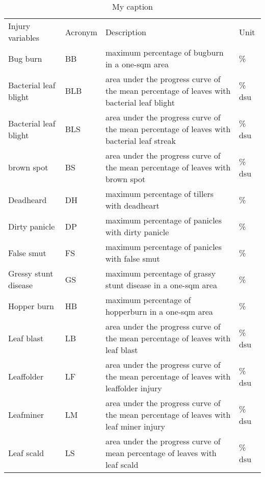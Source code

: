 \begin{table}[]
\centering
\caption{My caption}
\label{my-label}
\begin{tabular}{llll}
Injury variables              & Acronym & Description                                                                              & Unit  \\
Bug burn              & BB      & maximum percentage of bugburn in a one-sqm area                                           & \%     \\
Bacterial leaf blight & BLB     & area under the progress curve of the mean percentage of leaves with bacterial leaf blight & \% dsu \\
Bacterial leaf blight & BLS     & area under the progress curve of the mean percentage of leaves with bacterial leaf streak & \% dsu \\
brown spot            & BS      & area under the progress curve of the mean percentage of leaves with brown spot            & \% dsu \\
Deadheard             & DH      & maximum percentage of tillers with deadheart                                              & \%     \\
Dirty panicle         & DP      & maximum percentage of panicles with dirty panicle                                         & \%     \\
False smut            & FS      & maximum percentage of panicles with false smut                                            & \%     \\
Gressy stunt disease  & GS      & maximum percentage of grassy stunt disease in a one-sqm area                              & \%     \\
Hopper burn           & HB      & maximum percentage of hopperburn in a one-sqm area                                        & \%     \\
Leaf blast            & LB      & area under the progress curve of the mean percentage of leaves with leaf blast            & \% dsu \\
Leaffolder            & LF      & area under the progress curve of the mean percentage of leaves with leaffolder injury     & \% dsu \\
Leafminer             & LM      & area under the progress curve of the mean percentage of leaves with leaf miner injury     & \% dsu \\
Leaf scald            & LS      & area under the progress curve of mean percentage of leaves with leaf scald                & \% dsu \\

\end{tabular}
\end{table}
